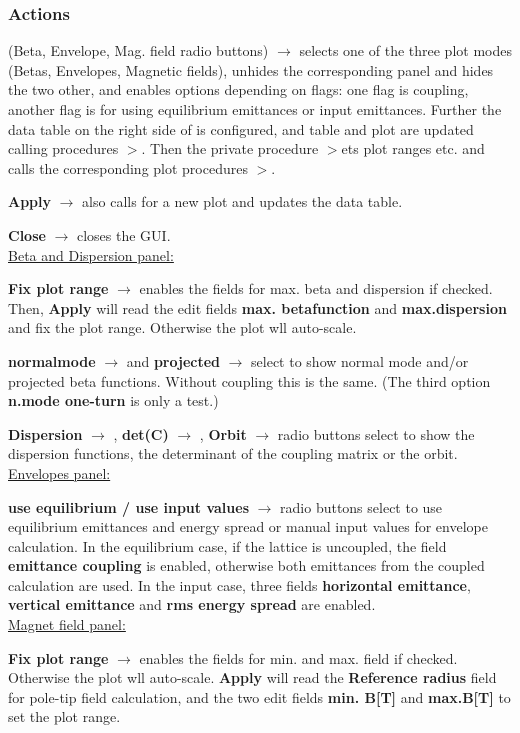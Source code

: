 \documentclass[12pt]{article}
\newcommand\code[1]{{\tt #1}}
\newcommand{\ofld}[1]{\colorbox{black!15}{{{\color{black}\bf #1}}}}
\newcommand{\ofldx}[1]{\colorbox{black!15}{{\color{black}(#1)}}}
\newcommand\guico[1]{{\color{blue}\code{#1}}}
\newcommand{\unico}[1]{{\color{burntorange}\code{#1}}}
\newcommand{\evcod}[2]{\ofld{#1} $\rightarrow$ \guico{#2}}
\newcommand{\evcodx}[2]{\ofldx{#1} $\rightarrow$ \guico{#2}}
\newcommand{\prcod}[2]{\opauni{#1}$>$\unico{#2}}
\newcommand{\opagui}[1]{\colorbox{blue!20}{{\color{black}\code{#1}}}}
\newcommand{\ogui}[1]{\hyperref[#1]{\opagui{#1}}}
\newcommand{\opauni}[1]{\colorbox{orange!30}{{\color{black}\code{#1}}}}
\newcommand{\act}[1]{\subsubsection*{Actions} #1}
\begin{document}
\act{
\evcodx{Beta, Envelope, Mag. field radio buttons}{rmodClick} selects one of the three plot modes (Betas, Envelopes, Magnetic fields), unhides the corresponding panel and hides the two other, and enables options depending on flags: one flag is coupling, another flag is for using equilibrium emittances or input emittances. Further the data table on the right side of \ogui{opalinop} is configured, and table and plot are updated calling procedures \prcod{linoplib}{InitBetaTab,FillBetaTab}. Then the private procedure \prcod{MakePlot} sets plot ranges etc. and calls the corresponding plot procedures \prcod{linoplib}{PlotBeta,EnvPlot,MagPLot}.

\evcod{Apply}{butgoClick} also calls for a new plot and updates the data table.

\evcod{Close}{butcanClick} closes the GUI.\\

\underline{Beta and Dispersion panel:}

\evcod{Fix plot range}{cbxbetamaxClick} enables the fields for max. beta and dispersion if checked. Then, \ofld{Apply} will read the edit fields \ofld{max. betafunction} and \ofld{max.dispersion} and fix the plot range. Otherwise the plot wll auto-scale.

\evcod{normalmode}{chk\_betabChange} and \evcod{projected}{chk\_betxyChange} select to show normal mode and/or projected beta functions. Without coupling this is the same. (The third option \ofld{n.mode one-turn} is only a test.)

\evcod{Dispersion}{rbu\_dspChange}, \evcod{det(C)}{rbu\_cdetChange}, \evcod{Orbit}{rbu\_orbiChange} radio buttons select to show the dispersion functions, the determinant of the coupling matrix or the orbit.\\

\underline{Envelopes panel:}

\evcod{use equilibrium / use input values}{rbuClick} radio buttons select to use equilibrium emittances and energy spread or manual input values for envelope calculation. In the equilibrium case, if the lattice is uncoupled, the field \ofld{emittance coupling} is enabled, otherwise both emittances from the coupled calculation are used. In the input case, three fields \ofld{horizontal emittance}, \ofld{vertical emittance} and \ofld{rms energy spread} are enabled.\\

\underline{Magnet field panel:}

\evcod{Fix plot range}{chk\_bfieldfixClick} enables the fields for min. and max. field if checked. Otherwise the plot wll auto-scale. \ofld{Apply} will read the \ofld{Reference radius} field for pole-tip field calculation, and the two edit fields \ofld{min. B[T]} and \ofld{max.B[T]} to set the plot range. 

}
\end{document}
